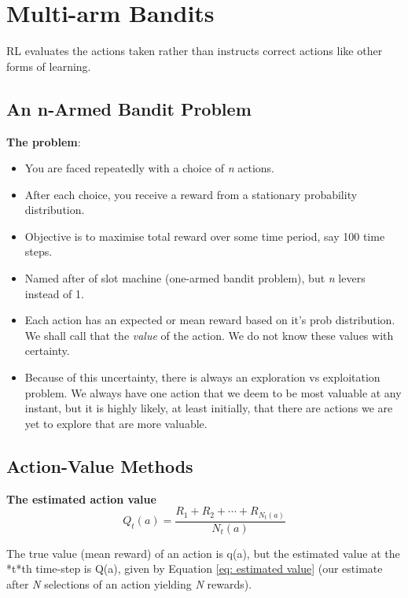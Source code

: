 \section{Multi-arm Bandits}

RL evaluates the actions taken rather than instructs correct actions like other forms of learning.

\subsection{An n-Armed Bandit Problem}
\textbf{The problem}:\\
\begin{itemize}
\item You are faced repeatedly with a choice of \textit{n} actions.
\item After each choice, you receive a reward from a stationary probability distribution.
\item Objective is to maximise total reward over some time period, say 100 time steps.
\item Named after of slot machine (one-armed bandit problem), but \textit{n} levers instead of 1.
\item Each action has an expected or mean reward based on it's prob distribution. We shall call that the \textit{value} of the action. We do not know these values with certainty.
\item Because of this uncertainty, there is always an exploration vs exploitation problem. We always have one action that we deem to be most valuable at any instant, but it is highly likely, at least initially, that there are actions we are yet to explore that are more valuable.
\end{itemize}

\subsection{Action-Value Methods}
\textbf{The estimated action value}
\begin{equation} \label{eq: estimated value}
	Q_t(a) = \frac{R_1+R_2+\cdots+R_{N_t(a)}}{N_t(a)}
\end{equation}

The true value (mean reward) of an action is q(a), but the estimated value at the *t*th time-step is Q(a), given by Equation \ref{eq: estimated value} (our estimate after \textit{N} selections of an action yielding \textit{N} rewards).\\

